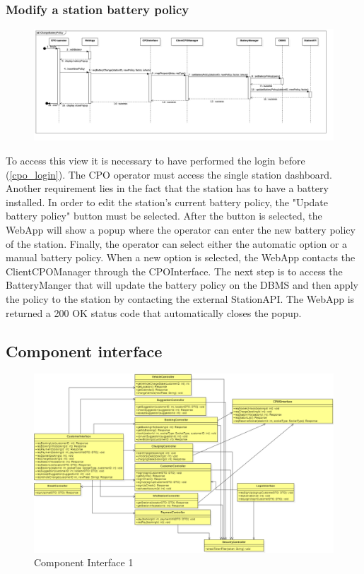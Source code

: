 \subsubsection{Modify a station battery policy}
\begin{figure}[H]
    \begin{center}
        \includegraphics[width=\textwidth]{img/runtime/cpo_battery}
    \end{center}
\end{figure}
To access this view it is necessary to have performed the login before (\ref{cpo_login}). The CPO operator must access the single station dashboard. Another requirement lies in the fact that the station has to have a battery installed. In order to edit the station's current battery policy, the "Update battery policy" button must be selected. After the button is selected, the WebApp will show a popup where the operator can enter the new battery policy of the station. Finally, the operator can select either the automatic option or a manual battery policy. When a new option is selected, the WebApp contacts the ClientCPOManager through the CPOInterface. The next step is to access the BatteryManger that will update the battery policy on the DBMS and then apply the policy to the station by contacting the external StationAPI. The WebApp is returned a 200 OK status code that automatically closes the popup.
\subsection{Component interface}

\begin{figure}[H]
    \begin{center}
        \includegraphics[width=\textwidth]{img/ComponentInterface1.PNG}
        \caption{Component Interface 1}\label{component_interface1}
    \end{center}
\end{figure}

